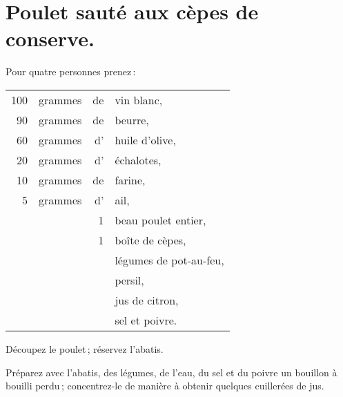\section*{\centering Poulet sauté aux cèpes de conserve.}
{}

Pour quatre personnes prenez :

\medskip

\footnotesize
\begin{longtable}{rrrp{16em}}
    100 & grammes & de & vin blanc,                                                                       \\
     90 & grammes & de & beurre,                                                                          \\
     60 & grammes & d' & huile d'olive,                                                                   \\
     20 & grammes & d' & échalotes,                                                                       \\
     10 & grammes & de & farine,                                                                          \\
      5 & grammes & d' & ail,                                                                             \\
        &         &  1 & beau poulet entier,                                                              \\
        &         &  1 & boîte de cèpes,                                                                  \\
        &         &    & légumes de pot-au-feu,                                                           \\
        &         &    & persil,                                                                          \\
        &         &    & jus de citron,                                                                   \\
        &         &    & sel et poivre.                                                                   \\
\end{longtable}
\normalsize

Découpez le poulet ; réservez l'abatis.

Préparez avec l'abatis, des légumes, de l'eau, du sel et du poivre un bouillon
à bouilli perdu ; concentrez-le de manière à obtenir quelques cuillerées de
jus.

